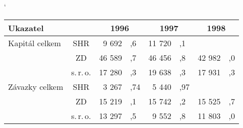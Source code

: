 \documentclass{article}
\begin{document}
{
\catcode`
\begin{tabular}{|l|c|*3{r@{}l|}}
\hline
\textbf{Ukazatel}&&\multicolumn{2}{|c|}{\textbf{1996}}&\multicolumn{2}{|c|}{\textbf{1997}}&\multicolumn{2}{|c|}{\textbf{1998}}\\
\hline
\hline
Kapitál celkem&SHR&9 692&,6&11 720&,1&&\\
\cline{2-8}
&ZD&46 589&,7&46 456&,8&42 982&,0\\
\cline{2-8}
&s.\,r.\,o.&17 280&,3&19 638&,3&17 931&,3\\
\hline
Závazky celkem&SHR&3 267&,74&5 440&,97&&\\
\cline{2-8}
&ZD&15 219&,1&15 742&,2&15 525&,7\\
\cline{2-8}
&s.\,r.\,o.&13 297&,5&9 552&,8&11 803&,0\\
\hline

\end{tabular}
}
\end{document}
